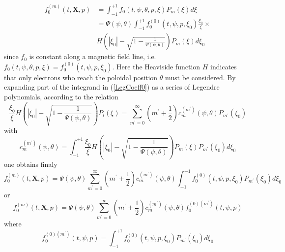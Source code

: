 \begin{align}
f_{0}^{\left( m\right) }\left( t,\mathbf{X},p\right) &
=\int_{-1}^{+1}f_{0}\left( t,\psi ,\theta ,p,\xi \right) P_{m}\left( \xi
\right) d\xi   \nonumber \\
& =\Psi \left( \psi ,\theta \right) \int_{-1}^{+1}f_{0}^{\left( 0\right)
}\left( t,\psi ,p,\xi _{0}\right) \frac{\xi _{0}}{\xi }\times   \nonumber \\
& H\left( \left| \xi _{0}\right| -\sqrt{1-\frac{1}{\Psi \left( \psi ,\theta
\right) }}\right) P_{m}\left( \xi \right) d\xi _{0}  \label{LegCoeff0}
\end{align}
since $f_{0}$ is constant along a magnetic field line, i.e. $f_{0}\left(
t,\psi ,\theta ,p,\xi \right) =f_{0}^{\left( 0\right) }\left( t,\psi ,p,\xi
_{0}\right) .$ Here the Heaviside function $H$ indicates that only electrons
who reach the poloidal position $\theta $ must be considered. By expanding
part of the integrand in (\ref{LegCoeff0}) as a series of Legendre
polynomials, according to the relation
\begin{equation}
\frac{\xi _{0}}{\xi }H\left( \left| \xi _{0}\right| -\sqrt{1-\frac{1}{\Psi
\left( \psi ,\theta \right) }}\right) P_{l}\left( \xi \right)
=\sum_{m^{\prime }=0}^{\infty }\left( m^{\prime }+\frac{1}{2}\right)
c_{m}^{\left( m^{\prime }\right) }\left( \psi ,\theta \right) P_{m^{\prime
}}\left( \xi _{0}\right)
\end{equation}
with
\begin{equation}
c_{m}^{\left( m^{\prime }\right) }\left( \psi ,\theta \right) =\int_{-1}^{+1}%
\frac{\xi _{0}}{\xi }H\left( \left| \xi _{0}\right| -\sqrt{1-\frac{1}{\Psi
\left( \psi ,\theta \right) }}\right) P_{m}\left( \xi \right) P_{m^{\prime
}}\left( \xi _{0}\right) d\xi _{0}
\end{equation}
one obtains finaly
\begin{equation}
f_{0}^{\left( m\right) }\left( t,\mathbf{X},p\right) =\Psi \left( \psi
,\theta \right) \sum_{m^{\prime }=0}^{\infty }\left( m^{\prime }+\frac{1}{2}%
\right) c_{m}^{\left( m^{\prime }\right) }\left( \psi ,\theta \right)
\int_{-1}^{+1}f_{0}^{\left( 0\right) }\left( t,\psi ,p,\xi _{0}\right)
P_{m^{\prime }}\left( \xi _{0}\right) d\xi _{0}
\end{equation}
or
\begin{equation}
f_{0}^{\left( m\right) }\left( t,\mathbf{X},p\right) =\Psi \left( \psi
,\theta \right) \sum_{m^{\prime }=0}^{\infty }\left( m^{\prime }+\frac{1}{2}%
\right) c_{m}^{\left( m^{\prime }\right) }\left( \psi ,\theta \right)
f_{0}^{\left( 0\right) \left( m^{\prime }\right) }\left( t,\psi ,p\right)
\end{equation}
where
\begin{equation}
f_{0}^{\left( 0\right) \left( m^{\prime }\right) }\left( t,\psi ,p\right)
=\int_{-1}^{+1}f_{0}^{\left( 0\right) }\left( t,\psi ,p,\xi _{0}\right)
P_{m^{\prime }}\left( \xi _{0}\right) d\xi _{0}
\end{equation}

